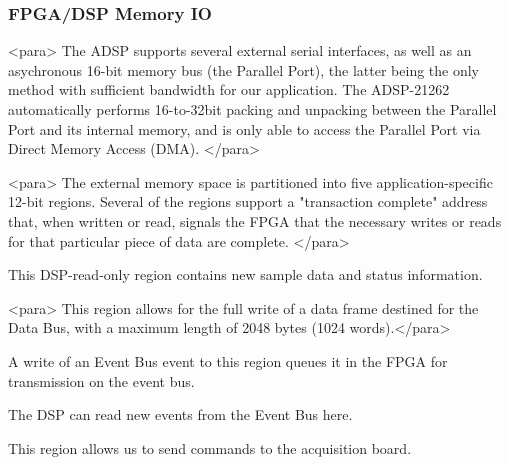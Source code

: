 \documentclass{article}
\begin{document}
\subsubsection{FPGA/DSP Memory IO}

<para> The ADSP supports several external serial interfaces, as well
as an asychronous 16-bit memory bus (the Parallel Port), the latter
being the only method with sufficient bandwidth for our application.
The ADSP-21262 automatically performs 16-to-32bit packing and
unpacking between the Parallel Port and its internal memory, and is
only able to access the Parallel Port via Direct Memory Access (DMA).
</para>

<para> The external memory space is partitioned into five
application-specific 12-bit regions. Several of the regions support a
"transaction complete" address that, when written or read, signals the
FPGA that the necessary writes or reads for that particular piece of
data are complete.  </para>

This DSP-read-only region contains new sample data and status
information.



<para> This region allows for the full write of a data frame destined
for the Data Bus, with a maximum length of 2048 bytes (1024
words).</para>



A write of an Event Bus event to this region queues it in the FPGA for
transmission on the event bus.


The DSP can read new events from the Event Bus here. 


This region allows us to send commands to the acquisition board. 

\end{document}
